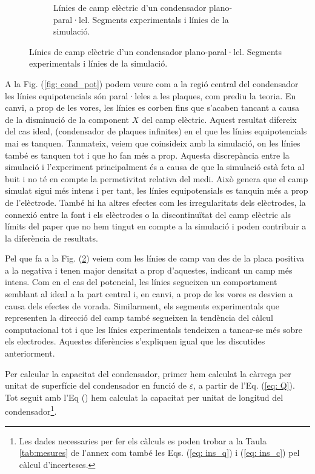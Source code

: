 \documentclass[11pt]{article}
\begin{document}
\begin{figure}[h]
\begin{subfigure}{0.495\textwidth}
        \caption{Línies de camp elèctric d'un condensador plano-paral·lel. Segments experimentals i línies de la simulació.}
        \label{fig: cond_e}
    \end{subfigure}
\end{figure}

A la Fig. (\ref{fig: cond_pot}) podem veure com a la regió central del condensador les línies equipotencials són paral·leles a les plaques, com prediu la teoria. En canvi, a prop de les vores, les línies es corben fins que s'acaben tancant a causa de la disminució de la component $X$ del camp elèctric. Aquest resultat difereix del cas ideal, (condensador de plaques infinites) en el que les línies equipotencials mai es tanquen. Tanmateix, veiem que coinsideix amb la simulació, on les línies també es tanquen tot i que ho fan més a prop. Aquesta discrepància entre la simulació i l'experiment principalment és a causa de que la simulació està feta al buit i no té en compte la permetivitat relativa del medi. Això genera que el camp simulat sigui més intens i per tant, les línies equipotensials es tanquin més a prop de l'elèctrode. També hi ha altres efectes com les irregularitats dels elèctrodes, la connexió entre la font i els elèctrodes o la discontinuïtat del camp elèctric als límits del paper que no hem tingut en compte a la simulació i poden contribuir a la diferència de resultats.

Pel que fa a la Fig. (\ref{fig: cond_e}) veiem com les línies de camp van des de la placa positiva a la negativa i tenen major densitat a prop d'aquestes, indicant un camp més intens. Com en el cas del potencial, les línies segueixen un comportament semblant al ideal a la part central i, en canvi, a prop de les vores es desvien a causa dels efectes de vorada. Similarment, els segments experimentals que representen la direcció del camp també segueixen la tendència del càlcul computacional tot i que les línies experimentals tendeixen a tancar-se més sobre els electrodes. Aquestes diferències s'expliquen igual que les discutides anteriorment.

Per calcular la capacitat del condensador, primer hem calculat la càrrega per unitat de superfície del condensador en funció de $\varepsilon$, a partir de l'Eq. (\ref{eq: Q}). Tot seguit amb l'Eq () hem calculat la capacitat per unitat de longitud del condensador\footnote{Les dades necessaries per fer els càlculs es poden trobar a la Taula \ref{tab:mesures} de l'annex com també les Eqs. (\ref{eq: ins_q}) i (\ref{eq: ins_c}) pel càlcul d'incerteses.}.
\end{document}
